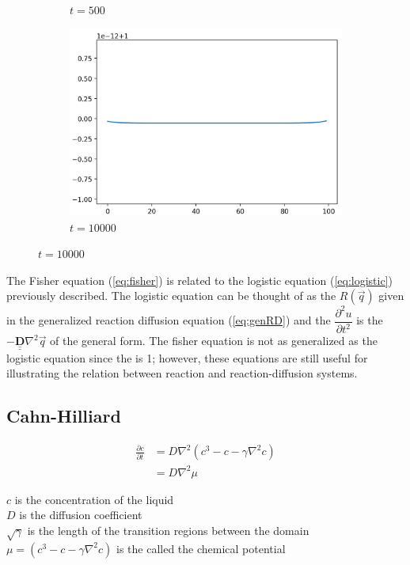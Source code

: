 \documentclass[12pt, letterpaper]{article}
\begin{document}
\begin{figure}[h]
\begin{subfigure}[b]{.23\linewidth}
    \caption{$t=500$}
  \end{subfigure}
  \begin{subfigure}[b]{.23\linewidth}
    \includegraphics[width=\linewidth]{Fisher/f10000.png}
    \caption{$t=10000$}
  \end{subfigure}
\end{figure}

The Fisher equation (\ref{eq:fisher}) is related to the logistic equation (\ref{eq:logistic}) previously
described. The logistic equation can be thought of as the $R(\vec{q})$ given in the generalized
reaction diffusion equation (\ref{eq:genRD}) and the $\dfrac{\partial^2 u}{\partial t^2}$ is the 
$ - \underline{\underline{\mathbf{D}}} \nabla^2 \vec{q} $ of the general form. The fisher equation is not as
generalized as the logistic equation since the  is 1; however, these equations are
still useful for illustrating the relation between reaction and reaction-diffusion systems.

\subsection{Cahn-Hilliard} \label{cahnhilliard}
\begin{singlespace}
  \begin{equation}\label{eq:cahnHilliard}
    \begin{split}
      \frac{\partial c}{\partial t} &= D \nabla^2 (c^3 -c -\gamma \nabla^2 c) \\
                                    &= D \nabla^2 \mu 
    \end{split}
  \end{equation}
  \begin{small}
$c$ is the concentration of the liquid \\
$D$ is the diffusion coefficient \\
$\sqrt{\gamma}$ is the length of the transition regions between the domain \\
$\mu = (c^3 - c -\gamma \nabla^2 c)$ is the called the chemical potential 
  \end{small}
\end{singlespace}
\end{document}
